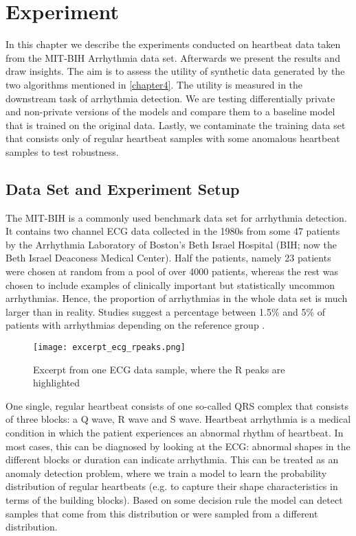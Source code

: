 \section{Experiment} \label{chapter5}
In this chapter we describe the experiments conducted on heartbeat data taken from the MIT-BIH Arrhythmia data set. Afterwards we present the results and draw insights. The aim is to assess the utility of synthetic data generated by the two algorithms mentioned in \cref{chapter4}. The utility is measured in the downstream task of arrhythmia detection. We are testing differentially private and non-private versions of the models and compare them to a baseline model that is trained on the original data. Lastly, we contaminate the training data set that consists only of regular heartbeat samples with some anomalous heartbeat samples to test robustness.

\subsection{Data Set and Experiment Setup}
The MIT-BIH is a commonly used benchmark data set for arrhythmia detection. It contains two channel ECG data collected in the 1980s from some 47 patients by the Arrhythmia Laboratory of Boston's Beth Israel Hospital (BIH; now the Beth Israel Deaconess Medical Center). Half the patients, namely 23 patients were chosen at random from a pool of over 4000 patients, whereas the rest was chosen to include examples of clinically important but statistically uncommon arrhythmias. Hence, the proportion of arrhythmias in the whole data set is much larger than in reality. Studies suggest a percentage between 1.5\% and 5\% of patients with arrhythmias depending on the reference group \parencite{desai2022arrhythmias}. 

\begin{figure}[h]
    \centering
    \texttt{[image: excerpt\_ecg\_rpeaks.png]}
    \caption{Excerpt from one ECG data sample, where the R peaks are highlighted}
\end{figure}

One single, regular heartbeat consists of one so-called QRS complex that consists of three blocks: a Q wave, R wave and S wave. Heartbeat arrhythmia is a medical condition in which the patient experiences an abnormal rhythm of heartbeat. In most cases, this can be diagnosed by looking at the ECG: abnormal shapes in the different blocks or duration can indicate arrhythmia. This can be treated as an anomaly detection problem, where we train a model to learn the probability distribution of regular heartbeats (e.g. to capture their shape characteristics in terms of the building blocks). Based on some decision rule the model can detect samples that come from this distribution or were sampled from a different distribution.

